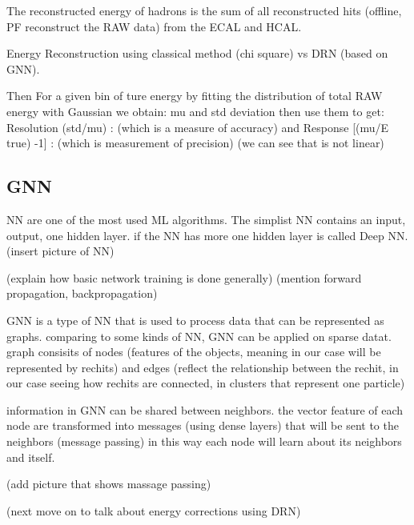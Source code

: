 The reconstructed energy of hadrons is the sum of all reconstructed hits (offline, PF reconstruct the RAW data) from the ECAL and HCAL.

Energy Reconstruction using classical  method (chi square) vs DRN (based on GNN).

Then For a given bin of ture energy
by fitting the distribution of total RAW energy with Gaussian we obtain: mu and std deviation then use them to get:
Resolution (std/mu) : (which is a measure of accuracy)
and Response [(mu/E true) -1] : (which is measurement of precision) (we can see that is not linear)


\subsection{GNN}

NN are one of the most used ML algorithms.
The simplist NN contains an input, output, one hidden layer.
if the NN has more one hidden layer is called Deep NN. 
(insert picture of NN) 

(explain how basic network training is done generally)
(mention forward propagation, backpropagation)

GNN is a type of NN that is used to process data that can be represented as graphs.
comparing to some kinds of NN,  GNN can be applied on sparse datat.
graph consisits of nodes (features of the objects, meaning in our case will be represented by rechits)
and edges (reflect the relationship between the rechit, in our case seeing how rechits are connected, in clusters that represent one particle)

information in GNN can be shared between neighbors.
the vector feature of each node are transformed into messages (using dense layers) that will be sent to the neighbors (message passing)
in this way each node will learn about its neighbors and itself.

(add picture that shows massage passing)


(next move on to talk about energy corrections using DRN)



